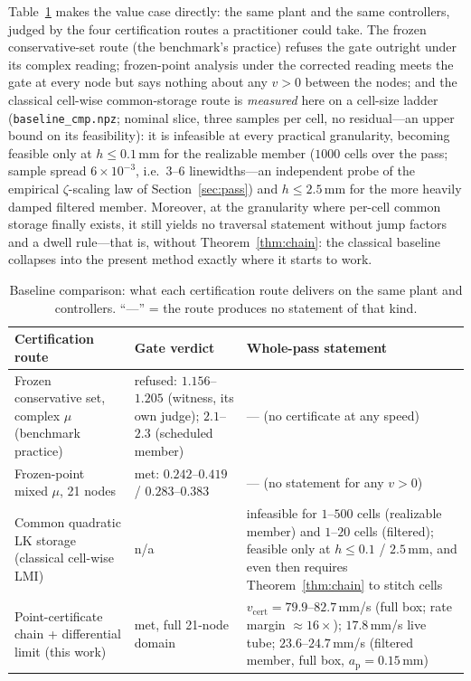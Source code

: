 \documentclass[preprint,12pt]{elsarticle}
\newcommand{\ap}{a_{\mathrm{p}}}
\newcommand{\vcert}{v_{\mathrm{cert}}}
\begin{document}
Table~\ref{tab:baseline} makes the value case directly: the same
plant and the same controllers, judged by the four certification
routes a practitioner could take.  The frozen conservative-set route
(the benchmark's practice) refuses the gate outright under its
complex reading; frozen-point analysis under the corrected reading
meets the gate at every node but says nothing about any $v > 0$
between the nodes; and the classical cell-wise common-storage route
is \emph{measured} here on a cell-size ladder
(\texttt{baseline\_cmp.npz}; nominal slice, three samples per cell,
no residual---an upper bound on its feasibility): it is infeasible at
every practical granularity, becoming feasible only at
$h \le 0.1$\,mm for the realizable member ($1000$ cells over the
pass; sample spread $6\times10^{-3}$, i.e.\ $3$--$6$ linewidths---an
independent probe of the empirical $\zeta$-scaling law of
Section~\ref{sec:pass}) and $h \le 2.5$\,mm for the more heavily
damped filtered member.  Moreover, at the granularity where per-cell
common storage finally exists, it still yields no traversal statement
without jump factors and a dwell rule---that is, without
Theorem~\ref{thm:chain}: the classical baseline collapses into the
present method exactly where it starts to work.

\begin{table}[t]
\centering\footnotesize
\caption{Baseline comparison: what each certification route delivers
on the same plant and controllers.  ``---'' = the route produces no
statement of that kind.}
\label{tab:baseline}
\begin{tabular}{@{}p{3.9cm}p{3.6cm}p{4.6cm}@{}}
\toprule
Certification route & Gate verdict & Whole-pass statement \\
\midrule
Frozen conservative set, complex $\mu$ (benchmark practice) &
refused: $1.156$--$1.205$ (witness, its own judge); $2.1$--$2.3$
(scheduled member) & --- (no certificate at any speed) \\
Frozen-point mixed $\mu$, 21 nodes &
met: $0.242$--$0.419$ / $0.283$--$0.383$ &
--- (no statement for any $v > 0$) \\
Common quadratic LK storage (classical cell-wise LMI) &
n/a &
infeasible for $1$--$500$ cells (realizable member) and $1$--$20$
cells (filtered); feasible only at $h \le 0.1$ / $2.5$\,mm, and even
then requires Theorem~\ref{thm:chain} to stitch cells \\
Point-certificate chain + differential limit (this work) &
met, full 21-node domain &
$\vcert = 79.9$--$82.7$\,mm/s (full box; rate margin
${\approx}16\times$); $17.8$\,mm/s live tube; $23.6$--$24.7$\,mm/s
(filtered member, full box, $\ap = 0.15$\,mm) \\
\bottomrule
\end{tabular}
\end{table}
\end{document}
